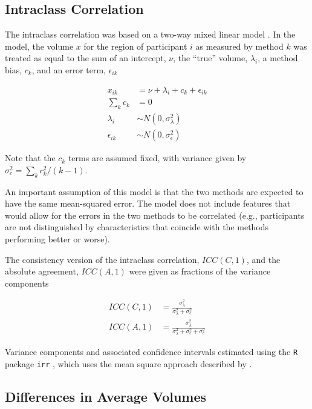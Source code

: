 \documentclass[
  authoryear,
  preprint,
  1p]{elsarticle}
\begin{document}
\subsection{Intraclass Correlation}\label{sec-icc-models}

The intraclass correlation was based on a two-way mixed linear model
\citep{mcgraw1996}. In the model, the volume \(x\) for the region of
participant \(i\) as measured by method \(k\) was treated as equal to
the sum of an intercept, \(\nu\), the ``true'' volume, \(\lambda_i\), a
method bias, \(c_k\), and an error term, \(\epsilon_{ik}\)

\[
\begin{aligned}
x_{ik} &= \nu + \lambda_i + c_k + \epsilon_{ik} \\
\sum_k c_k &= 0 \\
\lambda_i &\sim N(0,\sigma_\lambda^2) \\
\epsilon_{ik} &\sim N(0, \sigma_\epsilon^2)
\end{aligned}
\]

Note that the \(c_k\) terms are assumed fixed, with variance given by
\(\sigma_c^2=\sum_k c_k^2/(k-1)\).

An important assumption of this model is that the two methods are
expected to have the same mean-squared error. The model does not include
features that would allow for the errors in the two methods to be
correlated (e.g., participants are not distinguished by characteristics
that coincide with the methods performing better or worse).

The consistency version of the intraclass correlation, \(ICC(C,1)\), and
the absolute agreement, \(ICC(A,1)\) were given as fractions of the
variance components

\[
\begin{aligned}
ICC(C,1) & = \frac{\sigma_\lambda^2}{\sigma_\lambda^2 + \sigma_\epsilon^2} \\
ICC(A,1) & = \frac{\sigma_\lambda^2}{\sigma_\lambda^2 + \sigma_\epsilon^2 + \sigma_c^2}
\end{aligned}
\]

Variance components and associated confidence intervals estimated using
the \texttt{R} package \texttt{irr} \citep{core_r_2023, gamer_irr_2019},
which uses the mean square approach described by \citet{mcgraw1996}.

\subsection{Differences in Average Volumes}\label{sec-avg-shift}
\end{document}
